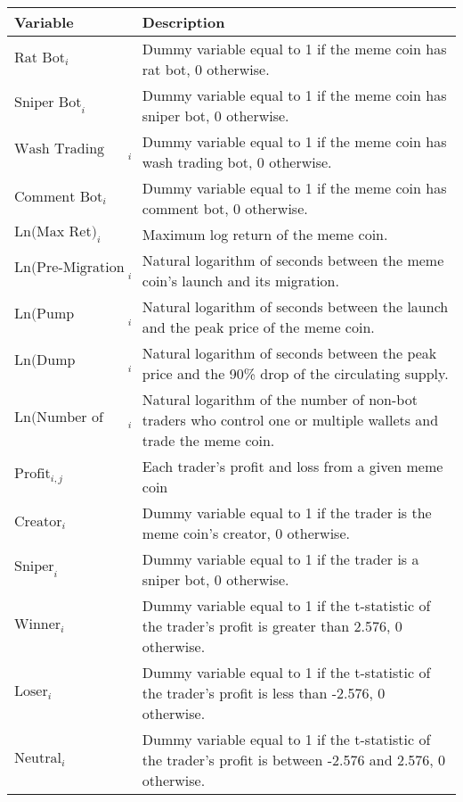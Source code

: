 \begin{tabularx}{\textwidth}{lX}\hline
Variable & Description \\
\hline
$\text{Rat Bot}_{i}$ & Dummy variable equal to 1 if the meme coin has rat bot, 0 otherwise. \\
$\text{Sniper Bot}_{i}$ & Dummy variable equal to 1 if the meme coin has sniper bot, 0 otherwise. \\
$\text{Wash Trading Bot}_{i}$ & Dummy variable equal to 1 if the meme coin has wash trading bot, 0 otherwise. \\
$\text{Comment Bot}_{i}$ & Dummy variable equal to 1 if the meme coin has comment bot, 0 otherwise. \\
$\text{Ln(Max Ret)}_{i}$ & Maximum log return of the meme coin. \\
$\text{Ln(Pre-Migration Duration)}_{i}$ & Natural logarithm of seconds between the meme coin's launch and its migration. \\
$\text{Ln(Pump Duration)}_{i}$ & Natural logarithm of seconds between the launch and the peak price of the meme coin. \\
$\text{Ln(Dump Duration)}_{i}$ & Natural logarithm of seconds between the peak price and the 90\% drop of the circulating supply. \\
$\text{Ln(Number of Traders)}_{i}$ & Natural logarithm of the number of non-bot traders who control one or multiple wallets and trade the meme coin. \\
$\text{Profit}_{i,j}$ & Each trader's profit and loss from a given meme coin \\
$\text{Creator}_{i}$ & Dummy variable equal to 1 if the trader is the meme coin's creator, 0 otherwise. \\
$\text{Sniper}_{i}$ & Dummy variable equal to 1 if the trader is a sniper bot, 0 otherwise. \\
$\text{Winner}_{i}$ & Dummy variable equal to 1 if the t-statistic of the trader's profit is greater than 2.576, 0 otherwise. \\
$\text{Loser}_{i}$ & Dummy variable equal to 1 if the t-statistic of the trader's profit is less than -2.576, 0 otherwise. \\
$\text{Neutral}_{i}$ & Dummy variable equal to 1 if the t-statistic of the trader's profit is between -2.576 and 2.576, 0 otherwise. \\
\hline
\end{tabularx}
